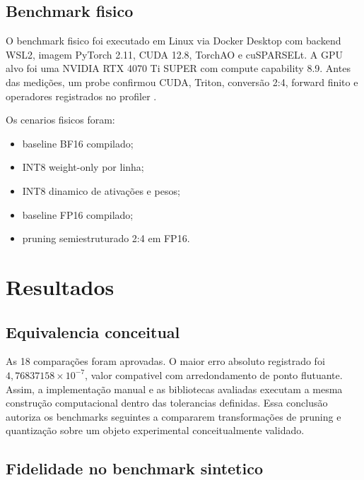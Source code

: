\documentclass[12pt, a4paper]{article}
\begin{document}
\subsection{Benchmark fisico}

O benchmark fisico foi executado em Linux via Docker Desktop com backend WSL2,
imagem PyTorch 2.11, CUDA 12.8, TorchAO e cuSPARSELt. A GPU alvo foi uma NVIDIA
RTX 4070 Ti SUPER com compute capability 8.9. Antes das medi\c{c}\~oes, um
probe confirmou CUDA, Triton, convers\~ao 2:4, forward finito e operadores
registrados no profiler \cite{docker2026,cusparselt2026,torchao2026}.

Os cenarios fisicos foram:

\begin{itemize}
  \item baseline BF16 compilado;
  \item INT8 weight-only por linha;
  \item INT8 dinamico de ativa\c{c}\~oes e pesos;
  \item baseline FP16 compilado;
  \item pruning semiestruturado 2:4 em FP16.
\end{itemize}

\section{Resultados}

\subsection{Equivalencia conceitual}

As 18 compara\c{c}\~oes foram aprovadas. O maior erro absoluto registrado foi
\(4{,}76837158 \times 10^{-7}\), valor compativel com arredondamento de ponto
flutuante. Assim, a implementa\c{c}\~ao manual e as bibliotecas avaliadas
executam a mesma constru\c{c}\~ao computacional dentro das tolerancias definidas.
Essa conclus\~ao autoriza os benchmarks seguintes a compararem transforma\c{c}\~oes
de pruning e quantiza\c{c}\~ao sobre um objeto experimental conceitualmente
validado.

\subsection{Fidelidade no benchmark sintetico}
\end{document}
